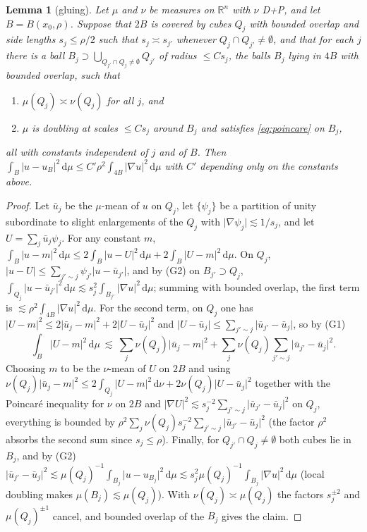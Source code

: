 \documentclass[11pt]{amsart}
\newcommand{\R}{\mathbb{R}}
\newcommand{\dd}{\,\mathrm{d}}
\newcommand{\abs}[1]{\lvert #1\rvert}
\theoremstyle{plain}
\newtheorem{lemma}[theorem]{Lemma}
\theoremstyle{definition}
\theoremstyle{remark}
\begin{document}
\begin{lemma}[gluing]\label{lem:glue}
Let $\mu$ and $\nu$ be measures on $\R^n$ with $\nu$ D+P, and let $B=B(x_0,\rho)$.
Suppose that $2B$ is covered by cubes $Q_j$ with bounded overlap and side
lengths $s_j\le\rho/2$ such that $s_j\asymp s_{j'}$ whenever $Q_j\cap Q_{j'}\ne
\emptyset$, and that for each $j$ there is a ball $B_j\supset\bigcup_{Q_{j'}\cap
Q_j\ne\emptyset}Q_{j'}$ of radius $\le Cs_j$, the balls $B_j$ lying in $4B$ with
bounded overlap, such that
\begin{enumerate}[label=\textup{(G\arabic*)},leftmargin=2.6em,itemsep=1pt]
\item $\mu(Q_j)\asymp\nu(Q_j)$ for all $j$, and
\item $\mu$ is doubling at scales $\le Cs_j$ around $B_j$ and satisfies
\eqref{eq:poincare} on $B_j$,
\end{enumerate}
all with constants independent of $j$ and of $B$. Then
$\int_B\abs{u-u_B}^2\dd\mu\le C'\rho^2\int_{4B}\abs{\nabla u}^2\dd\mu$ with $C'$
depending only on the constants above.
\end{lemma}

\begin{proof}
Let $\bar u_j$ be the $\mu$-mean of $u$ on $Q_j$, let $\{\psi_j\}$ be a
partition of unity subordinate to slight enlargements of the $Q_j$ with
$\abs{\nabla\psi_j}\lesssim1/s_j$, and let $U=\sum_j\bar u_j\psi_j$. For any
constant $m$, $\int_B\abs{u-m}^2\dd\mu\le2\int_B\abs{u-U}^2\dd\mu+2\int_B\abs{U-m}^2\dd\mu$.
On $Q_j$, $\abs{u-U}\le\sum_{j'\sim j}\psi_{j'}\abs{u-\bar u_{j'}}$, and by (G2)
on $B_{j'}\supset Q_j$,
$\int_{Q_j}\abs{u-\bar u_{j'}}^2\dd\mu\lesssim s_j^2\int_{B_{j'}}\abs{\nabla u}^2\dd\mu$;
summing with bounded overlap, the first term is $\lesssim\rho^2\int_{4B}
\abs{\nabla u}^2\dd\mu$. For the second term, on $Q_j$ one has
$\abs{U-m}^2\le2\abs{\bar u_j-m}^2+2\abs{U-\bar u_j}^2$ and
$\abs{U-\bar u_j}\le\sum_{j'\sim j}\abs{\bar u_{j'}-\bar u_j}$, so by (G1)
\[
\int_B\abs{U-m}^2\dd\mu\ \lesssim\ \sum_j\nu(Q_j)\abs{\bar u_j-m}^2+
\sum_j\nu(Q_j)\sum_{j'\sim j}\abs{\bar u_{j'}-\bar u_j}^2 .
\]
Choosing $m$ to be the $\nu$-mean of $U$ on $2B$ and using
$\nu(Q_j)\abs{\bar u_j-m}^2\le2\int_{Q_j}\abs{U-m}^2\dd\nu+2\nu(Q_j)\abs{U-\bar u_j}^2$
together with the Poincar\'e inequality for $\nu$ on $2B$ and
$\abs{\nabla U}^2\lesssim s_j^{-2}\sum_{j'\sim j}\abs{\bar u_{j'}-\bar u_j}^2$ on
$Q_j$, everything is bounded by
$\rho^2\sum_j\nu(Q_j)s_j^{-2}\sum_{j'\sim j}\abs{\bar u_{j'}-\bar u_j}^2$ (the
factor $\rho^2$ absorbs the second sum since $s_j\le\rho$). Finally, for
$Q_{j'}\cap Q_j\ne\emptyset$ both cubes lie in $B_j$, and by (G2)
$\abs{\bar u_{j'}-\bar u_j}^2\lesssim\mu(Q_j)^{-1}\int_{B_j}\abs{u-u_{B_j}}^2\dd\mu
\lesssim s_j^2\mu(Q_j)^{-1}\int_{B_j}\abs{\nabla u}^2\dd\mu$ (local doubling makes
$\mu(B_j)\lesssim\mu(Q_j)$). With $\nu(Q_j)\asymp\mu(Q_j)$ the factors $s_j^{\pm2}$
and $\mu(Q_j)^{\pm1}$ cancel, and bounded overlap of the $B_j$ gives the claim.
\end{proof}
\end{document}
